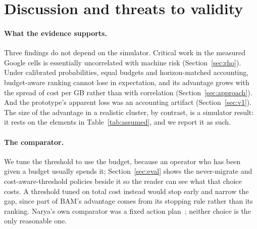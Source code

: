 \section{Discussion and threats to validity}
\label{sec:discussion}

\paragraph{What the evidence supports.}
Three findings do not depend on the simulator. Critical work in the measured Google cells is
essentially uncorrelated with machine risk (Section~\ref{sec:rho}). Under calibrated
probabilities, equal budgets and horizon-matched accounting, budget-aware ranking cannot lose in
expectation, and its advantage grows with the spread of cost per GB rather than with correlation
(Section~\ref{sec:approach}). And the prototype's apparent loss was an accounting artifact
(Section~\ref{sec:v1}). The size of the advantage in a realistic cluster, by contrast, is a
simulator result: it rests on the elements in Table~\ref{tab:assumed}, and we report it as such.

\paragraph{The comparator.}
We tune the threshold to use the budget, because an operator who has been given a budget usually
spends it; Section~\ref{sec:eval} shows the never-migrate and cost-aware-threshold policies beside it
so the reader can see what that choice costs. A threshold tuned on total cost instead would stop
early and narrow the gap, since part of BAM's advantage comes from its stopping rule rather than
its ranking. Narya's own comparator was a fixed action plan~\cite{levy2020narya}; neither choice
is the only reasonable one.

